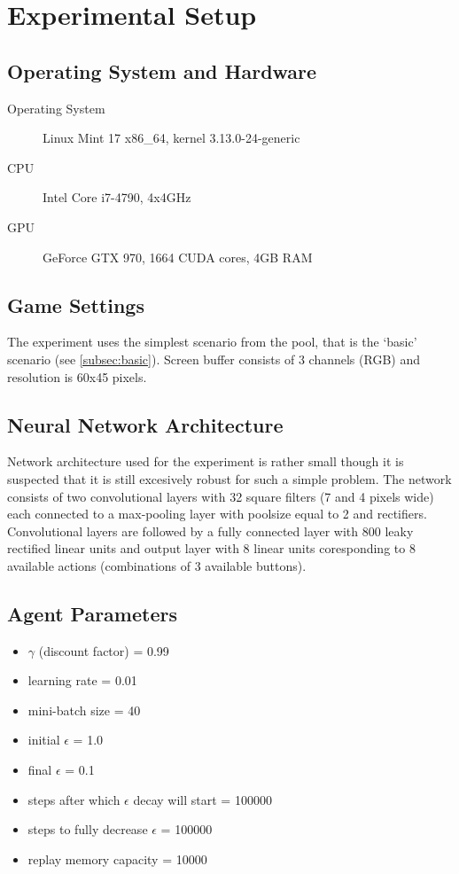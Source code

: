 \section{Experimental Setup} 
	\subsection{Operating System and Hardware}
	\begin{description}
		\item[Operating System] Linux Mint 17 x86\_64, kernel 3.13.0-24-generic
		\item[CPU] Intel Core i7-4790, 4x4GHz
		\item[GPU] GeForce GTX 970, 1664 CUDA cores, 4GB RAM
	\end{description}

	\subsection{Game Settings}
		The experiment uses the simplest scenario from the pool, that is the `basic' scenario (see \ref{subsec:basic}). Screen buffer consists of 3 channels (RGB) and resolution is 60x45 pixels.

	\subsection{Neural Network Architecture}
		Network architecture used for the experiment is rather small though it is suspected that it is still excesively robust for such a simple problem. The network consists of two convolutional layers with 32 square filters (7 and 4 pixels wide) each connected to a max-pooling layer with poolsize equal to 2 and rectifiers. Convolutional layers are followed by a fully connected layer with 800 leaky rectified linear units and output layer with 8 linear units coresponding to 8 available actions (combinations of 3 available buttons). 
	
	\subsection{Agent Parameters}
		\begin{itemize}
		\item $\gamma$ (discount factor) = 0.99
		\item learning rate = 0.01
		\item mini-batch size = 40
		\item initial $\epsilon$ = 1.0
		\item final $\epsilon$ = 0.1
		\item steps after which $\epsilon$ decay will start = 100000
		\item steps to fully decrease $\epsilon$ = 100000
		\item replay memory  capacity = 10000
		\end{itemize}
	

